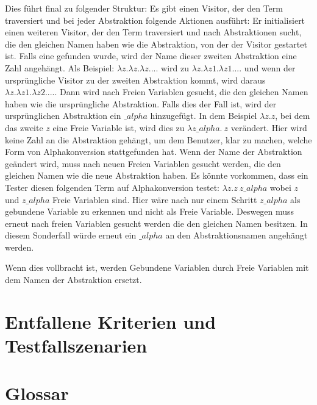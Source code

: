 \documentclass[parskip=full,11pt,twoside]{scrartcl}
\begin{document}
{Dies führt final zu folgender Struktur:
Es gibt einen Visitor, der den Term traversiert und bei jeder Abstraktion folgende Aktionen ausführt:
Er initialisiert einen weiteren Visitor, der den Term traversiert und nach Abstraktionen sucht, die den gleichen Namen
haben wie die Abstraktion, von der der Visitor gestartet ist. Falls eine gefunden wurde, wird der Name dieser zweiten
Abstraktion eine Zahl angehängt. Als Beispiel: $\lambda z. \lambda z. \lambda z. ...$ wird zu $\lambda z. \lambda z1. \lambda z1. ...$ und wenn der ursprüngliche Visitor zu der zweiten Abstraktion kommt, wird daraus $\lambda z. \lambda z1. \lambda z2. ...$.
Dann wird nach Freien Variablen gesucht, die den gleichen Namen haben wie die ursprüngliche Abstraktion. Falls dies
der Fall ist, wird der ursprünglichen Abstraktion ein $\_ alpha$ hinzugefügt. In dem Beispiel $\lambda z. z$, bei dem
das zweite $z$ eine Freie Variable ist, wird dies zu $\lambda z \_ alpha. \  z$ verändert.
Hier wird keine Zahl an die Abstraktion gehängt, um dem Benutzer, klar zu machen, welche Form von Alphakonversion
stattgefunden hat.
Wenn der Name der Abstraktion geändert wird, muss  nach neuen Freien Variablen gesucht werden, die den
gleichen Namen wie die neue Abstraktion haben. Es könnte vorkommen,
dass ein Tester diesen folgenden Term auf Alphakonversion testet: $\lambda z. z \ z\_ alpha$ wobei $z$ und
$z\_ alpha$ Freie Variablen sind.
Hier wäre nach nur einem Schritt $z\_ alpha$ als gebundene Variable zu erkennen und nicht als Freie Variable.
Deswegen muss erneut nach freien Variablen gesucht werden die den gleichen Namen besitzen.
In diesem Sonderfall würde erneut ein $\_ alpha$ an den Abstraktionsnamen angehängt werden.

Wenn dies vollbracht ist, werden Gebundene Variablen durch Freie Variablen mit dem Namen der Abstraktion ersetzt.


}
    \section{Entfallene Kriterien und Testfallszenarien}

    \section{Glossar}
\end{document}
